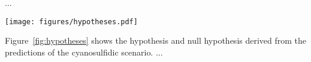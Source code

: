 \documentclass[modern,linenumbers]{aastex631}
\begin{document}
%


%

...
\begin{figure*}
    \begin{centering}
        \texttt{[image: figures/hypotheses.pdf]}
        \caption{Population-level hypothesis and null hypothesis on UV irradiance derived from the cyanosulfidic scenario.}
        \label{fig:hypotheses}
    \end{centering}
\end{figure*}
Figure~\ref{fig:hypotheses} shows the hypothesis and null hypothesis derived from the predictions of the cyanosulfidic scenario.
...
\end{document}

